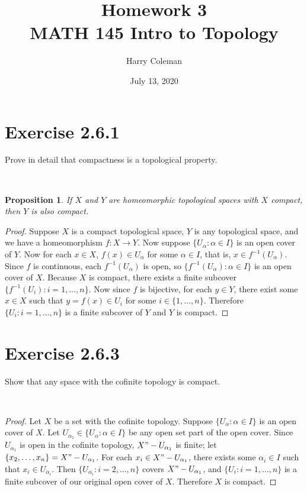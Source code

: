 \documentclass[12pt]{article}
\newtheorem{proposition}{Proposition}
\newenvironment{problem}
    {\begin{lrbox}{\mybox}\begin{minipage}{\textwidth-10pt}}
    {\end{minipage}\end{lrbox}\framebox[6.5in]{\usebox{\mybox}}\\}
\begin{document}
 
\title{Homework 3\\
    \large MATH 145 Intro to Topology
}
\author{Harry Coleman}
\date{July 13, 2020}
\maketitle

\section*{Exercise 2.6.1}
\begin{problem}
    Prove in detail that compactness is a topological property.
\end{problem}

\begin{proposition}
    If $X$ and $Y$ are homeomorphic topological spaces with $X$ compact, then $Y$ is also compact.
\end{proposition}

\begin{proof}
    Suppose $X$ is a compact topological space, $Y$ is any topological space, and we have a homeomorphism $f:X\to Y$. Now suppose $\{U_\alpha:\alpha\in I\}$ is an open cover of $Y$. Now for each $x\in X$, $f(x)\in U_\alpha$ for some $\alpha\in I$, that is, $x\in f^{-1}(U_\alpha)$. Since $f$ is continuous, each $f^{-1}(U_\alpha)$ is open, so $\{f^{-1}(U_\alpha) : \alpha\in I\}$ is an open cover of $X$. Because $X$ is compact, there exists a finite subcover $\{f^{-1}(U_i) : i=1,\dots,n\}$. Now since $f$ is bijective, for each $y\in Y$, there exist some $x\in X$ such that $y=f(x)\in U_i$ for some $i\in\{1,\dots,n\}$. Therefore $\{U_i : i=1,\dots,n\}$ is a finite subcover of $Y$ and $Y$ is compact.
    
\end{proof}

\section*{Exercise 2.6.3}
\begin{problem}
    Show that any space with the cofinite topology is compact.
\end{problem}

\begin{proof}
    Let $X$ be a set with the cofinite topology. Suppose $\{U_\alpha : \alpha\in I\}$ is an open cover of $X$. Let $U_{\alpha_1}\in\{U_\alpha : \alpha\in I\}$ be any open set part of the open cover. Since $U_{\alpha_1}$ is open in the cofinite topology, $X"-U_{\alpha_1}$ is finite; let $\{x_2,\dots,x_n\}=X"-U_{\alpha_1}$. For each $x_i\in X"-U_{\alpha_1}$, there exists some $\alpha_i\in I$ such that $x_i\in U_{\alpha_i}$. Then $\{U_{\alpha_i}:i=2,\dots,n\}$ covers $X"-U_{\alpha_1}$, and $\{U_i:i=1,\dots,n\}$ is a finite subcover of our original open cover of $X$. Therefore $X$ is compact.
    
\end{proof}
\end{document}
